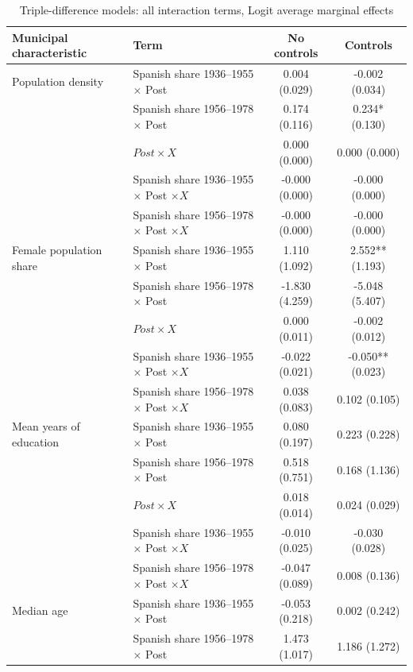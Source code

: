 \begin{table}[!htbp]
\small
\renewcommand{\arraystretch}{1}
\setlength{\tabcolsep}{3pt}
\centering
\caption{Triple-difference models: all interaction terms, Logit average marginal effects}
\label{tab:triple_all_interactions_ame_stata}
\captionsetup{justification=centering}
\begin{tabular}{llcc}
\hline
Municipal characteristic & Term & No controls & Controls \\
\hline
Population density & Spanish share 1936--1955 \(\times\) Post & 0.004 (0.029) & -0.002 (0.034) \\
 & Spanish share 1956--1978 \(\times\) Post & 0.174 (0.116) & 0.234* (0.130) \\
 & \(Post \times X\) & 0.000 (0.000) & 0.000 (0.000) \\
 & Spanish share 1936--1955 \(\times\) Post \(\times X\) & -0.000 (0.000) & -0.000 (0.000) \\
 & Spanish share 1956--1978 \(\times\) Post \(\times X\) & -0.000 (0.000) & -0.000 (0.000) \\
\addlinespace
Female population share & Spanish share 1936--1955 \(\times\) Post & 1.110 (1.092) & 2.552** (1.193) \\
 & Spanish share 1956--1978 \(\times\) Post & -1.830 (4.259) & -5.048 (5.407) \\
 & \(Post \times X\) & 0.000 (0.011) & -0.002 (0.012) \\
 & Spanish share 1936--1955 \(\times\) Post \(\times X\) & -0.022 (0.021) & -0.050** (0.023) \\
 & Spanish share 1956--1978 \(\times\) Post \(\times X\) & 0.038 (0.083) & 0.102 (0.105) \\
\addlinespace
Mean years of education & Spanish share 1936--1955 \(\times\) Post & 0.080 (0.197) & 0.223 (0.228) \\
 & Spanish share 1956--1978 \(\times\) Post & 0.518 (0.751) & 0.168 (1.136) \\
 & \(Post \times X\) & 0.018 (0.014) & 0.024 (0.029) \\
 & Spanish share 1936--1955 \(\times\) Post \(\times X\) & -0.010 (0.025) & -0.030 (0.028) \\
 & Spanish share 1956--1978 \(\times\) Post \(\times X\) & -0.047 (0.089) & 0.008 (0.136) \\
\addlinespace
Median age & Spanish share 1936--1955 \(\times\) Post & -0.053 (0.218) & 0.002 (0.242) \\
 & Spanish share 1956--1978 \(\times\) Post & 1.473 (1.017) & 1.186 (1.272) \\

\end{tabular}
\end{table}
